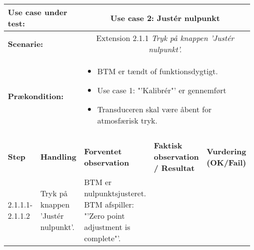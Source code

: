 \begin{tabular}{|p{1cm}|p{3cm}|p{4cm}|p{4cm}|p{2cm}|}
\hline
\multicolumn{2}{|p{3cm}|}{\textbf{Use case under test:}} & \multicolumn{3}{c|}{Use case 2: Justér nulpunkt} \\\hline

\multicolumn{2}{|p{3cm}|}{\textbf{Scenarie:}} & \multicolumn{3}{c|}{Extension 2.1.1 \textit{Tryk på knappen 'Justér nulpunkt'.}} \\\hline

\multicolumn{2}{|p{3cm}|}{\textbf{Prækondition:}}  & \multicolumn{3}{l|}{\parbox{0.6\textwidth}{
\begin{itemize}[label=$\circ$]
\item BTM er tændt of funktionsdygtigt.
\item Use case 1: "'Kalibrér"' er gennemført
\item Transduceren skal være åbent for atmosfærisk tryk.  
\end{itemize} }}\\\hline

\multicolumn{5}{|c|}{} \\\hline

\textbf{Step} & \textbf{Handling} & \textbf{Forventet observation} & \textbf{Faktisk observation / Resultat} & \textbf{Vurdering (OK/Fail)}\\\hline

2.1.1.1-2.1.1.2 & Tryk på knappen 'Justér nulpunkt'. & BTM er nulpunktsjusteret. BTM afspiller: "'Zero point adjustment is complete"'. & & \\\hline

\end{tabular}

